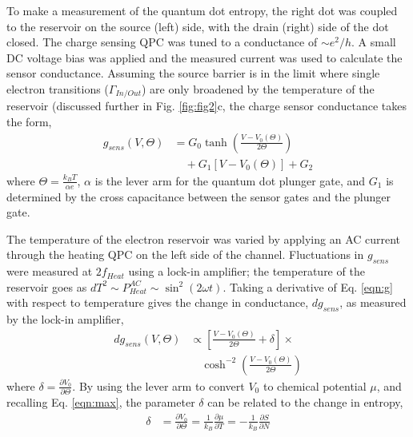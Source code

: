\documentclass[twocolumn,showpacs,preprintnumbers,amsmath,amssymb,pra,aps,superscriptaddress]{revtex4-1}
\begin{document}
To make a  measurement of the quantum dot entropy, the right dot was coupled to the reservoir on the source (left) side, with the drain (right) side of the dot closed. The charge sensing QPC  was tuned to a conductance of ${\sim}e^2/h$. A small DC voltage bias was applied and the measured current was used to calculate the sensor conductance.  Assuming the source barrier is in the limit where single electron transitions ($\Gamma_{In/Out}$) are only broadened by the temperature of the reservoir (discussed further in Fig. \ref{fig:fig2}c, the charge sensor conductance takes the form,
%
\begin{align}
\label{eqn:g}
        g_{sens}(V,\Theta) &= G_0 \tanh\left(\frac{V-V_0(\Theta)}{2\Theta}\right)  \\
                        &\quad + G_1\left[V-V_0(\Theta)\right] + G_2 \nonumber
\end{align}
%
where $\Theta = \frac{k_B T}{\alpha e}$, $\alpha$ is the lever arm for the quantum dot plunger gate, and $G_1$ is determined by the cross capacitance between the sensor gates and the plunger gate.

The temperature of the electron reservoir was varied by applying an AC current through the heating QPC on the left side of the channel. Fluctuations in $g_{sens}$ were measured at $2f_{Heat}$ using a lock-in amplifier; the temperature of the reservoir goes as $dT^2 \sim P^{AC}_{Heat} \sim \sin^2(2\omega t)$. Taking a derivative of Eq. \ref{eqn:g} with respect to temperature gives the change in conductance, $dg_{sens}$, as measured by the lock-in amplifier,
%
\begin{align}
\label{eqn:dg}
        dg_{sens}(V, \Theta) &\propto \left[ \frac{V-V_0(\Theta)}{2\Theta} + \delta \right]\times \\
        				      &\quad\cosh^{-2}\left(\frac{V-V_0(\Theta)}{2\Theta}\right) \nonumber
\end{align}
%
where $\delta=\frac{\partial V_0}{\partial \Theta}$. By using the lever arm to convert $V_0$ to chemical potential $\mu$, and recalling Eq. \ref{eqn:max}, the parameter $\delta$ can be related to the change in entropy,
%
\begin{align}
\label{eqn:delta}
        \delta &= \frac{\partial V_0}{\partial \Theta} = 
        \frac{1}{k_B} \frac{\partial \mu}{\partial T} = 
        -\frac{1}{k_B} \frac{\partial S}{\partial N}
\end{align}
%
\end{document}
